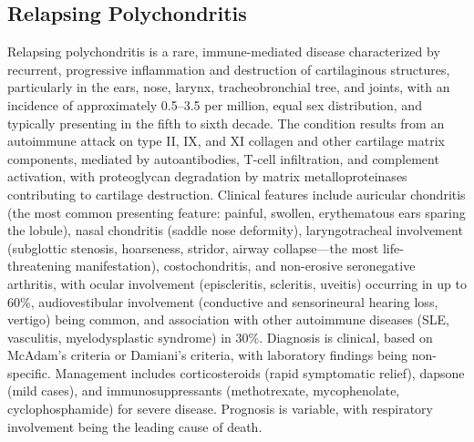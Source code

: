 \subsection{Relapsing Polychondritis}
\label{sec:Relapsing Polychondritis}
Relapsing polychondritis is a rare, immune-mediated disease characterized by recurrent, progressive inflammation and destruction of cartilaginous structures, particularly in the ears, nose, larynx, tracheobronchial tree, and joints, with an incidence of approximately 0.5--3.5 per million, equal sex distribution, and typically presenting in the fifth to sixth decade. The condition results from an autoimmune attack on type II, IX, and XI collagen and other cartilage matrix components, mediated by autoantibodies, T-cell infiltration, and complement activation, with proteoglycan degradation by matrix metalloproteinases contributing to cartilage destruction. Clinical features include auricular chondritis (the most common presenting feature: painful, swollen, erythematous ears sparing the lobule), nasal chondritis (saddle nose deformity), laryngotracheal involvement (subglottic stenosis, hoarseness, stridor, airway collapse---the most life-threatening manifestation), costochondritis, and non-erosive seronegative arthritis, with ocular involvement (episcleritis, scleritis, uveitis) occurring in up to 60\%, audiovestibular involvement (conductive and sensorineural hearing loss, vertigo) being common, and association with other autoimmune diseases (SLE, vasculitis, myelodysplastic syndrome) in 30\%. Diagnosis is clinical, based on McAdam's criteria or Damiani's criteria, with laboratory findings being non-specific. Management includes corticosteroids (rapid symptomatic relief), dapsone (mild cases), and immunosuppressants (methotrexate, mycophenolate, cyclophosphamide) for severe disease. Prognosis is variable, with respiratory involvement being the leading cause of death.


